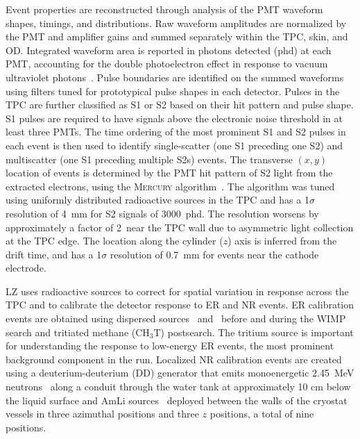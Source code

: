 Event properties are reconstructed through analysis of the PMT waveform shapes, timings, and distributions. Raw waveform amplitudes are normalized by the PMT and amplifier gains and summed separately within the TPC, skin, and OD. Integrated waveform area is reported in photons detected (phd) at each PMT, accounting for the double photoelectron effect in response to vacuum ultraviolet photons~\cite{faham2015measurements, LOPEZPAREDESdpe}. Pulse boundaries are identified on the summed waveforms using filters tuned for prototypical pulse shapes in each detector. Pulses in the TPC are further classified as S1 or S2 based on their hit pattern and pulse shape. S1 pulses are required to have signals above the electronic noise threshold in at least three PMTs. The time ordering of the most prominent S1 and S2 pulses in each event is then used to identify single-scatter (one S1 preceding one S2) and multiscatter (one S1 preceding multiple S2s) events. The transverse $(x,y)$ location of events is determined by the PMT hit pattern of S2 light from the extracted electrons, using the \textsc{Mercury} algorithm~\cite{Mercury}. The algorithm was tuned using uniformly distributed radioactive sources in the TPC and has a 1$\sigma$ resolution of \SI{4}{mm} for S2 signals of \SI{3000}{phd}. The resolution worsens by approximately a factor of 2~near the TPC wall due to asymmetric light collection at the TPC edge. The location along the cylinder ($z$) axis is inferred from the drift time, and has a 1$\sigma$ resolution of \SI{0.7}{mm} for events near the cathode electrode.

LZ uses radioactive sources to correct for spatial variation in response across the TPC and to calibrate the detector response to ER and NR events. ER calibration events are obtained using dispersed sources \KrEightThreem\ and \XeOneThreeOnem\ before and during the WIMP search and tritiated methane (CH$_3$T) postsearch. The tritium source is important for understanding the response to low-energy ER events, the most prominent background component in the run. Localized NR calibration events are created using a deuterium-deuterium (DD) generator that emits monoenergetic \SI{2.45}{MeV} neutrons~\cite{adelphi, Verbus_others_2017, LUX_DD} along a conduit through the water tank at approximately 10 cm below the liquid surface and AmLi sources~\cite{MOZHAYEVAmLi} deployed between the walls of the cryostat vessels in three azimuthal positions and three $z$ positions, a total of nine positions.

